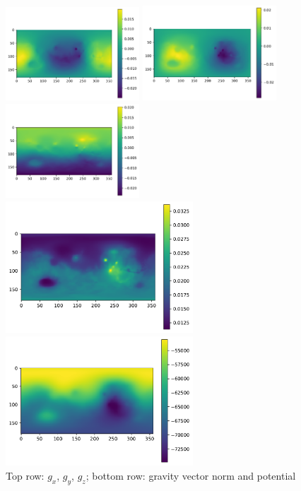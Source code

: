\begin{center}
\includegraphics[width=5cm]{python_codes/fieldstone_100/results/one/gx}
\includegraphics[width=5cm]{python_codes/fieldstone_100/results/one/gy}
\includegraphics[width=5cm]{python_codes/fieldstone_100/results/one/gz}\\
\includegraphics[width=7cm]{python_codes/fieldstone_100/results/one/gg}
\includegraphics[width=7cm]{python_codes/fieldstone_100/results/one/UU}\\
{\captionfont Top row: $g_x$, $g_y$, $g_z$;
bottom row: gravity vector norm and potential}
\end{center}


